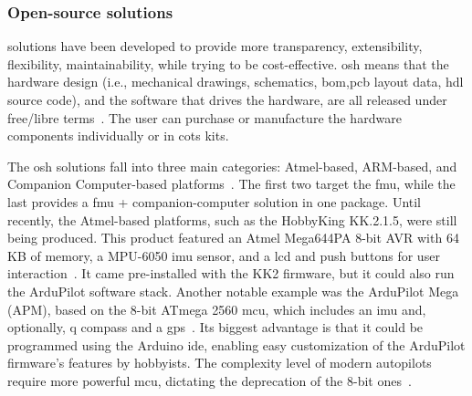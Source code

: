 \subsubsection{Open-source solutions}%
\label{sec:open-source-solut-hw}
 solutions have been developed to provide more transparency,
extensibility, flexibility, maintainability, while trying to be
cost-effective. \gls{osh} means that the hardware design (i.e., mechanical
drawings, schematics, \gls{bom},\gls{pcb} layout data, \gls{hdl} source code),
and the software that drives the hardware, are all released under free/libre
terms~\cite{freeGNU}.
The user can purchase or manufacture the hardware components
individually or in \gls{cots} kits.

The \gls{osh} solutions fall into three main categories: Atmel-based,
ARM-based, and Companion Computer-based
platforms~\cite{ebeidUAVPlatformsSurvey2017}. The first two target the
\gls{fmu}, while the last provides a \gls{fmu} + companion-computer solution in
one package. Until recently, the Atmel-based platforms, such as the HobbyKing
KK.2.1.5, were still being produced. This product featured an Atmel Mega644PA
8-bit AVR with 64 KB of memory, a MPU-6050 \gls{imu} sensor, and a \gls{lcd} and
push buttons for user interaction~\cite{hobbykingKK2}. It came pre-installed
with the KK2 firmware, but it could also run the ArduPilot software
stack. Another notable example was the ArduPilot Mega (APM), based on the
8-bit ATmega 2560 \gls{mcu}, which includes an \gls{imu} and, optionally, q
compass and a \gls{gps}~\cite{ardupilotMega}. Its biggest advantage is that it could be programmed using the
Arduino \gls{ide}, enabling easy customization of the ArduPilot firmware's
features by hobbyists. The complexity level of modern autopilots require more
powerful \gls{mcu}, dictating the deprecation of the 8-bit ones~\cite{fmu8BitDeprecation}.  

